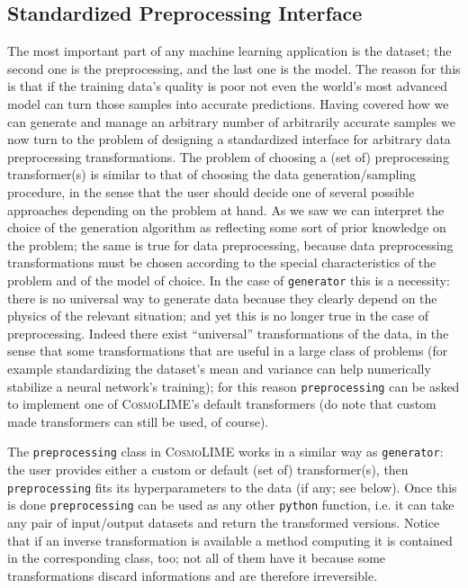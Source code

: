 \subsection{Standardized Preprocessing Interface}
The most important part of any machine learning application is the dataset; the second one is the preprocessing, and the last one is the model. The reason for this is that if the training data's quality is poor not even the world's most advanced model can turn those samples into accurate predictions. Having covered how we can generate and manage an arbitrary number of arbitrarily accurate samples we now turn to the problem of designing a standardized interface for arbitrary data preprocessing transformations.
The problem of choosing a (set of) preprocessing transformer(s) is similar to that of choosing the data generation/sampling procedure, in the sense that the user should decide one of several possible approaches depending on the problem at hand. As we saw we can interpret the choice of the generation algorithm as reflecting some sort of prior knowledge on the problem; the same is true for data preprocessing, because data preprocessing transformations must be chosen according to the special characteristics of the problem and of the model of choice.
In the case of \texttt{generator} this is a necessity: there is no universal way to generate data because they clearly depend on the physics of the relevant situation; and yet this is no longer true in the case of preprocessing. Indeed there exist ``universal'' transformations of the data, in the sense that some transformations that are useful in a large class of problems (for example standardizing the dataset's mean and variance can help numerically stabilize a neural network's training); for this reason \texttt{preprocessing} can be asked to implement one of \textsc{CosmoLIME}'s default transformers (do note that custom made transformers can still be used, of course).

The \texttt{preprocessing} class in \textsc{CosmoLIME} works in a similar way as \texttt{generator}: the user provides either a custom or default (set of) transformer(s), then \texttt{preprocessing} fits its hyperparameters to the data (if any; see below). Once this is done \texttt{preprocessing} can be used as any other \texttt{python} function, i.e. it can take any pair of input/output datasets and return the transformed versions. Notice that if an inverse transformation is available a method computing it is contained in the corresponding class, too; not all of them have it because some transformations discard informations and are therefore irreversible.

